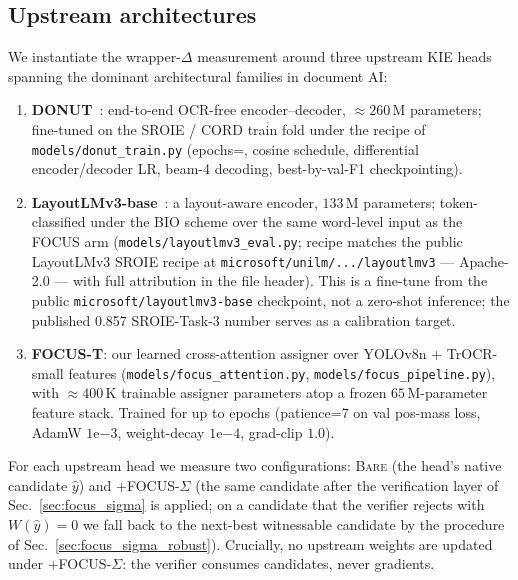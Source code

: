\subsection{Upstream architectures}
\label{sec:experiments_arms}

We instantiate the wrapper-$\Delta$ measurement around three upstream
KIE heads spanning the dominant architectural families in document
AI:

\begin{enumerate}[label=\textbf{(\arabic*)},leftmargin=2.0em]
\item \textbf{DONUT}~\cite{kim2022donut}: end-to-end OCR-free
  encoder--decoder, $\approx\!260\,\mathrm{M}$ parameters; fine-tuned
  on the SROIE / CORD train fold under the recipe of
  \texttt{models/donut\_train.py} (epochs=,
  cosine schedule, differential encoder/decoder LR, beam-4 decoding,
  best-by-val-F1 checkpointing).
\item \textbf{LayoutLMv3-base}~\cite{huang2022layoutlmv3}: a
  layout-aware encoder, $133\,\mathrm{M}$ parameters; token-classified
  under the BIO scheme over the same word-level input as the FOCUS
  arm (\texttt{models/layoutlmv3\_eval.py}; recipe matches the
  public LayoutLMv3 SROIE recipe at
  \texttt{microsoft/unilm/.../layoutlmv3} — Apache-2.0 — with full
  attribution in the file header).  This is a fine-tune from the
  public \texttt{microsoft/layoutlmv3-base} checkpoint, not a
  zero-shot inference; the published 0.857 SROIE-Task-3 number serves
  as a calibration target.
\item \textbf{FOCUS-T}: our learned cross-attention assigner over
  YOLOv8n + TrOCR-small features (\texttt{models/focus\_attention.py},
  \texttt{models/focus\_pipeline.py}), with $\approx\!400\,\mathrm{K}$
  trainable assigner parameters atop a frozen $65\,\mathrm{M}$-parameter
  feature stack.  Trained for up to  epochs
  (patience=7 on val pos-mass loss, AdamW $1\mathrm{e}{-3}$,
  weight-decay $1\mathrm{e}{-4}$, grad-clip $1.0$).
\end{enumerate}

For each upstream head we measure two configurations:
\textsc{Bare} (the head's native candidate $\hat y$) and
\textsc{+FOCUS-$\Sigma$} (the same candidate after the verification
layer of Sec.~\ref{sec:focus_sigma} is applied; on a candidate that
the verifier rejects with $W(\hat y)=0$ we fall back to the next-best
witnessable candidate by the procedure of
Sec.~\ref{sec:focus_sigma_robust}).  Crucially, no upstream weights
are updated under \textsc{+FOCUS-$\Sigma$}: the verifier consumes
candidates, never gradients.

